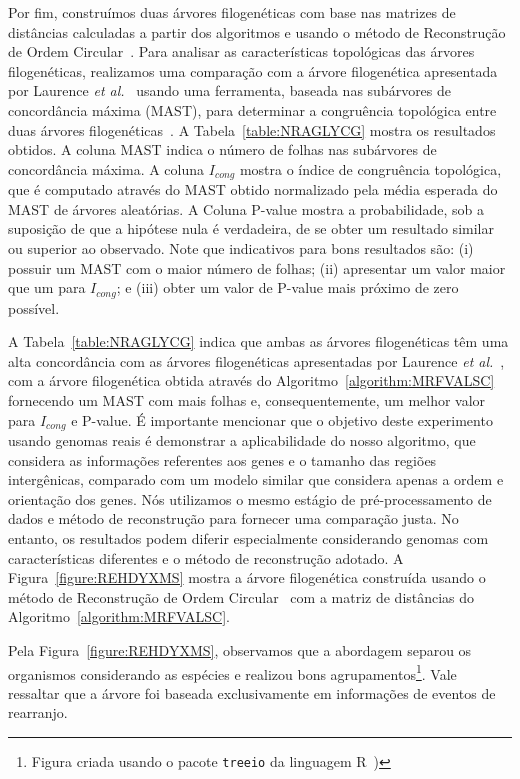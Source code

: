 Por fim, construímos duas árvores filogenéticas com base nas matrizes de distâncias calculadas a partir dos algoritmos e usando o método de Reconstrução de Ordem Circular~\cite{makarenkov1997tree}. Para analisar as características topológicas das árvores filogenéticas, realizamos uma comparação com a árvore filogenética apresentada por Laurence \textit{et al.}~\cite{cyanorak} usando uma ferramenta, baseada nas subárvores de concordância máxima (MAST), para determinar a congruência topológica entre duas árvores filogenéticas~\cite{de2007congruence}. A Tabela~\ref{table:NRAGLYCG} mostra os resultados obtidos. A coluna MAST indica o número de folhas nas subárvores de concordância máxima. A coluna $I_{cong}$ mostra o índice de congruência topológica, que é computado através do MAST obtido normalizado pela média esperada do MAST de árvores aleatórias. A Coluna P-value mostra a probabilidade, sob a suposição de que a hipótese nula é verdadeira, de se obter um resultado similar ou superior ao observado. Note que indicativos para bons resultados são: (i) possuir um MAST com o maior número de folhas; (ii) apresentar um valor maior que um para $I_{cong}$; e (iii) obter um valor de P-value mais próximo de zero possível.



A Tabela~\ref{table:NRAGLYCG} indica que ambas as árvores filogenéticas têm uma alta concordância com as árvores filogenéticas apresentadas por Laurence \textit{et al.}~\cite{cyanorak}, com a árvore filogenética obtida através do Algoritmo~\ref{algorithm:MRFVALSC} fornecendo um MAST com mais folhas e, consequentemente, um melhor valor para $I_{cong}$ e P-value. É importante mencionar que o objetivo deste experimento usando genomas reais é demonstrar a aplicabilidade do nosso algoritmo, que considera as informações referentes aos genes e o tamanho das regiões intergênicas, comparado com um modelo similar que considera apenas a ordem e orientação dos genes. Nós utilizamos o mesmo estágio de pré-processamento de dados e método de reconstrução para fornecer uma comparação justa. No entanto, os resultados podem diferir especialmente considerando genomas com características diferentes e o método de reconstrução adotado. A Figura~\ref{figure:REHDYXMS} mostra a árvore filogenética construída usando o método de Reconstrução de Ordem Circular~\cite{makarenkov1997tree} com a matriz de distâncias do Algoritmo~\ref{algorithm:MRFVALSC}.



Pela Figura~\ref{figure:REHDYXMS}, observamos que a abordagem separou os organismos considerando as espécies e realizou bons agrupamentos\footnote{Figura criada usando o pacote \texttt{treeio} da linguagem R~\cite{wang2020treeio})}. Vale ressaltar que a árvore foi baseada exclusivamente em informações de eventos de rearranjo.

